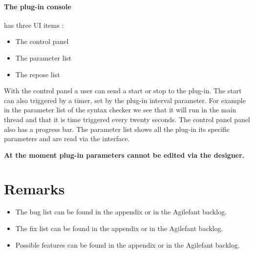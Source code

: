 \paragraph{The plug-in console}has three UI items :
\begin{itemize}
\item The control panel
\item The parameter list
\item The repose list
\end{itemize}

With the control panel a user can send a start or stop to the plug-in. The start
can also triggered by a timer, set by the plug-in interval parameter. For
example in the parameter list of the syntax checker we see that it will run in
the main thread and that it is time triggered every twenty seconds. The control
panel panel also has a progress bar. The parameter list shows all the plug-in
its specific parameters and are read via the interface.

\begin{tcolorbox}[colback=white]
\textbf{
At the moment plug-in parameters cannot be edited via the designer.
}
\end{tcolorbox}


\section{Remarks}
\begin{itemize}
\item The bug list can be found in the appendix or in the Agilefant backlog.
\item The fix list can be found in the appendix or in the Agilefant backlog.
\item Possible features can be found in the appendix or in the Agilefant backlog.
\end{itemize}

